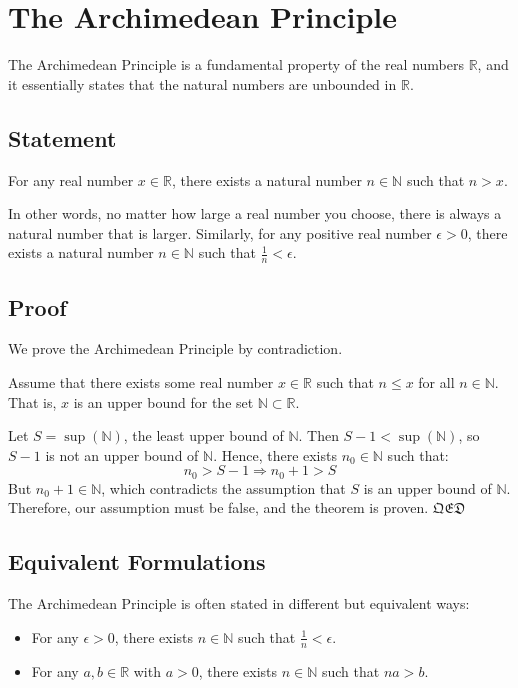\section{The Archimedean Principle}

The Archimedean Principle is a fundamental property of the real numbers \( \mathbb{R} \), and it essentially states that the natural numbers are unbounded in \( \mathbb{R} \).

\subsection{Statement}

For any real number \( x \in \mathbb{R} \), there exists a natural number \( n \in \mathbb{N} \) such that \( n > x \).


In other words, no matter how large a real number you choose, there is always a natural number that is larger. Similarly, for any positive real number \( \epsilon > 0 \), there exists a natural number \( n \in \mathbb{N} \) such that \( \frac{1}{n} < \epsilon \).

\subsection{Proof}

We prove the Archimedean Principle by contradiction.

Assume that there exists some real number \( x \in \mathbb{R} \) such that \( n \leq x \) for all \( n \in \mathbb{N} \). That is, \( x \) is an upper bound for the set \( \mathbb{N} \subset \mathbb{R} \).

Let \( S = \sup(\mathbb{N}) \), the least upper bound of \( \mathbb{N} \). Then \( S - 1 < \sup(\mathbb{N}) \), so \( S - 1 \) is not an upper bound of \( \mathbb{N} \). Hence, there exists \( n_0 \in \mathbb{N} \) such that:
\[
	n_0 > S - 1 \Rightarrow n_0 + 1 > S
\]
But \( n_0 + 1 \in \mathbb{N} \), which contradicts the assumption that \( S \) is an upper bound of \( \mathbb{N} \). Therefore, our assumption must be false, and the theorem is proven.
$\mathfrak{QED}$

\subsection{Equivalent Formulations}

The Archimedean Principle is often stated in different but equivalent ways:

\begin{itemize}
	\item For any \( \epsilon > 0 \), there exists \( n \in \mathbb{N} \) such that \( \frac{1}{n} < \epsilon \).
	\item For any \( a, b \in \mathbb{R} \) with \( a > 0 \), there exists \( n \in \mathbb{N} \) such that \( na > b \).
\end{itemize}

